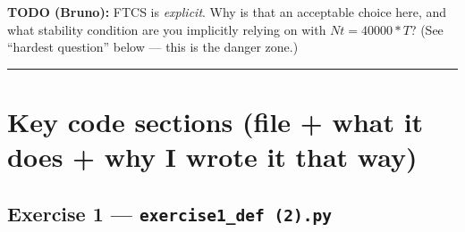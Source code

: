 \documentclass[
  11pt,
]{article}
\begin{document}
\textbf{TODO (Bruno):} FTCS is \emph{explicit}. Why is that an
acceptable choice here, and what stability condition are you implicitly
relying on with \(Nt = 40000*T\)? (See ``hardest question'' below ---
this is the danger zone.)

\begin{center}\rule{0.5\linewidth}{0.5pt}\end{center}

\hypertarget{key-code-sections-file-what-it-does-why-i-wrote-it-that-way}{%
\section{Key code sections (file + what it does + why I wrote it that
way)}\label{key-code-sections-file-what-it-does-why-i-wrote-it-that-way}}

\hypertarget{exercise-1-exercise1_def-2.py}{%
\subsection{\texorpdfstring{Exercise 1 ---
\texttt{exercise1\_def\ (2).py}}{Exercise 1 --- exercise1\_def (2).py}}\label{exercise-1-exercise1_def-2.py}}
\end{document}
